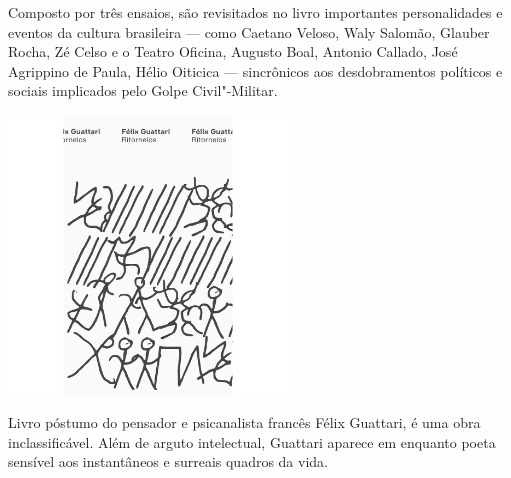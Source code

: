 Composto por três ensaios, são revisitados no livro importantes personalidades e eventos da cultura brasileira --- como Caetano Veloso, Waly Salomão, Glauber Rocha, Zé Celso e o Teatro Oficina, Augusto Boal, Antonio Callado, José Agrippino de Paula, Hélio Oiticica --- sincrônicos aos desdobramentos políticos e sociais implicados pelo Golpe Civil"-Militar.

\vfill

\hspace*{-.4cm}\begin{minipage}[c]{.5\linewidth}
\small{
{}}
\end{minipage}

\pagebreak %

\begin{center}
\hspace*{.5cm}\includegraphics[width=74mm]{./grid/guattari.jpg}
\end{center}

\hspace*{-7cm}\hrulefill\hspace*{-7cm}

\medskip

\noindent{}Livro póstumo do pensador e psicanalista francês Félix Guattari, {} é uma obra inclassificável.  Além de arguto intelectual, Guattari aparece em {} enquanto poeta sensível aos instantâneos e surreais quadros da vida.

